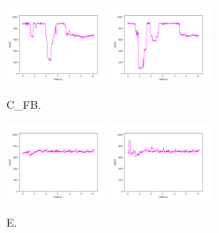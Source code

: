 \begin{figure}[!ht]
\begin{center}
\includegraphics[width=0.3\textwidth]{../data/C_FB/C_FB_2.png}
\includegraphics[width=0.3\textwidth]{../data/C_FB/C_FB_3.png}
\caption{C\_FB.\label{fig:C_FB}}
\end{center}
\end{figure}

\begin{figure}[!ht]
\begin{center}
\includegraphics[width=0.3\textwidth]{../data/E2/E2_2.png}
\includegraphics[width=0.3\textwidth]{../data/E2/E2_3.png}
\caption{E.\label{fig:C_FB}}
\end{center}
\end{figure}





